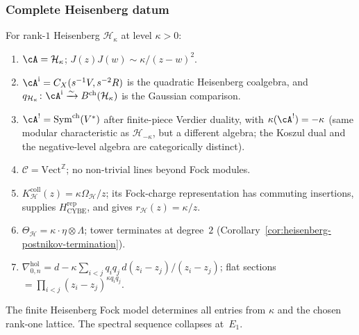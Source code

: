 \subsubsection{Complete Heisenberg datum}

\begin{computation}
\label{comp:heisenberg-holographic-datum}
For rank-$1$ Heisenberg $\mathcal{H}_\kappa$ at level $\kappa > 0$:
\begin{enumerate}[label=\textup{(\roman*)}]
\item $\cA = \mathcal{H}_\kappa$; $J(z)J(w) \sim \kappa/(z{-}w)^2$.
\item $\cA^{\mathrm i}=C_X(s^{-1}V,s^{-2}R)$ is the quadratic
 Heisenberg coalgebra, and
 $q_{\mathcal H_\kappa}\colon\cA^{\mathrm i}\xrightarrow{\sim}
 B^{\mathrm{ch}}(\mathcal H_\kappa)$ is the Gaussian comparison.
\item $\cA^! = \operatorname{Sym}^{\mathrm{ch}}(V^*)$ after
 finite-piece Verdier duality, with
 $\kappa(\cA^!) = -\kappa$
 \textup{(}same modular characteristic as $\mathcal{H}_{-\kappa}$,
 but a different algebra; the Koszul dual and the negative-level
 algebra are categorically distinct\textup{)}.
\item $\mathcal{C} = \mathrm{Vect}^{\mathbb{Z}}$; no non-trivial lines
 beyond Fock modules.
\item $K_{\mathcal H}^{\mathrm{coll}}(z)=
 \kappa\Omega_{\mathcal H}/z$; its Fock-charge representation has
 commuting insertions, supplies $H_{\mathrm{CYBE}}^{\mathrm{rep}}$,
 and gives $r_{\mathcal H}(z)=\kappa/z$.
\item $\Theta_{\mathcal{H}} = \kappa \cdot \eta \otimes \Lambda$;
 tower terminates at degree~$2$
 \textup{(}Corollary~\textup{\ref{cor:heisenberg-postnikov-termination})}.
\item $\nabla^{\mathrm{hol}}_{0,n} =
 d - \kappa \sum_{i<j} q_i q_j\, d(z_i{-}z_j)/(z_i{-}z_j)$;
 flat sections $= \prod_{i<j}(z_i{-}z_j)^{\kappa q_i q_j}$.
\end{enumerate}
The finite Heisenberg Fock model determines all entries from
$\kappa$ and the chosen rank-one lattice. The spectral sequence
collapses at~$E_1$.
\end{computation}

